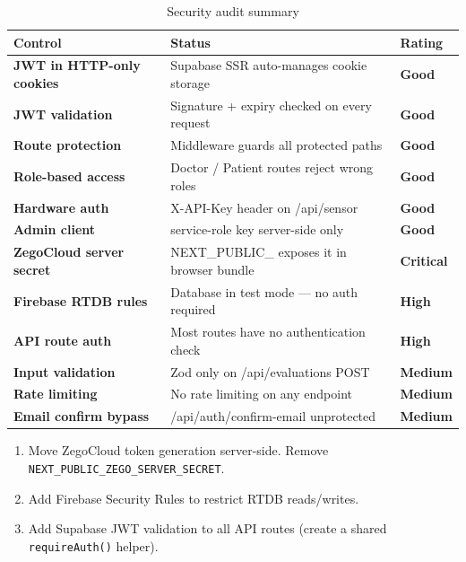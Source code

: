 \documentclass[12pt,a4paper]{report}
\begin{document}
\begin{table}[H]\centering\renewcommand{\arraystretch}{1.5}
\begin{tabularx}{\linewidth}{>{\bfseries}l X >{\bfseries}l}
\toprule
Control & Status & Rating \\
\midrule
JWT in HTTP-only cookies & Supabase SSR auto-manages cookie storage & \textcolor{success}{Good} \\
JWT validation & Signature + expiry checked on every request & \textcolor{success}{Good} \\
Route protection & Middleware guards all protected paths & \textcolor{success}{Good} \\
Role-based access & Doctor / Patient routes reject wrong roles & \textcolor{success}{Good} \\
Hardware auth & X-API-Key header on /api/sensor & \textcolor{success}{Good} \\
Admin client & service-role key server-side only & \textcolor{success}{Good} \\
\midrule
ZegoCloud server secret & NEXT\_PUBLIC\_ exposes it in browser bundle & \textcolor{danger}{Critical} \\
Firebase RTDB rules & Database in test mode --- no auth required & \textcolor{warning}{High} \\
API route auth & Most routes have no authentication check & \textcolor{warning}{High} \\
Input validation & Zod only on /api/evaluations POST & \textcolor{warning}{Medium} \\
Rate limiting & No rate limiting on any endpoint & \textcolor{warning}{Medium} \\
Email confirm bypass & /api/auth/confirm-email unprotected & \textcolor{warning}{Medium} \\
\bottomrule
\end{tabularx}
\caption{Security audit summary}
\end{table}

\begin{dangerbox}
\begin{enumerate}[leftmargin=2em]
  \item Move ZegoCloud token generation server-side. Remove \texttt{NEXT\_PUBLIC\_ZEGO\_SERVER\_SECRET}.
  \item Add Firebase Security Rules to restrict RTDB reads/writes.
  \item Add Supabase JWT validation to all API routes (create a shared \texttt{requireAuth()} helper).
\end{enumerate}
\end{dangerbox}
\end{document}
